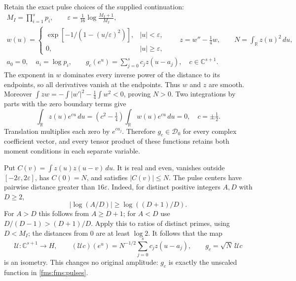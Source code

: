 \documentclass[11pt,a4paper]{article}
\theoremstyle{definition}\newtheorem{definition}[theorem]{Definition}
\newcommand{\C}{\mathbb C}\newcommand{\R}{\mathbb R}
\begin{document}
Retain the exact pulse choices of the supplied continuation:
\begin{equation}\tag{FMS18}\label{fms:fms:pulses}
 \begin{gathered}
 M_I=\prod_{i=1}^s p_i,\qquad
 \varepsilon=\frac1{16}\log\frac{M_I+1}{M_I},\\
 w(u)=
 \begin{cases}
 \exp[-1/(1-(u/\varepsilon)^2)],&|u|<\varepsilon,\\
 0,&|u|\ge\varepsilon,
 \end{cases}
 \qquad z=w''-\tfrac14w,\qquad
 N=\int_\R z(u)^2\,du,\\
 a_0=0,\quad a_i=\log p_i,\qquad
 g_c(e^u)=\sum_{j=0}^s c_jz(u-a_j),\quad c\in\C^{s+1}.
 \end{gathered}
\end{equation}
The exponent in $w$ dominates every inverse power of the distance
to its endpoints, so all derivatives vanish at the endpoints.
Thus $w$ and $z$ are smooth. Moreover
$\int zw=-\int|w'|^2-\frac14\int w^2<0$, proving $N>0$.
Two integrations by parts with the zero boundary terms give
\[
 \int_\R z(u)e^{cu}\,du=(c^2-\tfrac14)
               \int_\R w(u)e^{cu}\,du=0,\quad c=\pm\tfrac12.
\]
 Translation multiplies each zero by $e^{ca_j}$.
 Therefore $g_c\in\mathcal D_0$ for every complex coefficient
vector, and every tensor product of these functions retains both
moment conditions in each separate variable.

Put $C(v)=\int z(u)z(u-v)\,du$. It is real and even, vanishes
outside $[-2\varepsilon,2\varepsilon]$, has $C(0)=N$, and satisfies
$|C(v)|\le N$. The pulse centers have pairwise distance greater
than $16\varepsilon$. Indeed, for distinct positive integers
$A,D$ with $D\ge2$,
\begin{equation}\tag{FMS19}\label{fms:fms:integergap}
 |\log(A/D)|\ge\log((D+1)/D).
\end{equation}
For $A>D$ this follows from $A\ge D+1$; for $A<D$ use
$D/(D-1)>(D+1)/D$. Apply this to ratios of distinct primes,
using $D<M_I$; the distances from $0$ are at least $\log2$.
It follows that the map
\begin{equation}\tag{FMS20}\label{fms:fms:embedding}
 \mathcal U:\C^{s+1}\longrightarrow H,\qquad
 (\mathcal Uc)(e^u)=N^{-1/2}\sum_{j=0}^s c_jz(u-a_j),
 \qquad g_c=\sqrt N\,\mathcal Uc
\end{equation}
is an isometry. This changes no original amplitude:
$g_c$ is exactly the unscaled function in \eqref{fms:fms:pulses}.
\end{document}
